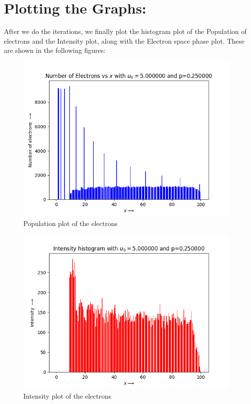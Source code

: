 \documentclass[11pt, a4paper]{article}
\begin{document}
\section{Plotting the Graphs:}
After we do the iterations, we finally plot the histogram plot of the Population of electrons and the Intensity plot, along with the Electron space phase plot. These are shown in the following figures:
\clearpage

\begin{figure}[!tbh]
\centering
\includegraphics[scale=0.56]{hist1_elec_density.png} 
\caption{Population plot of the electrons}
\label{fig:fig_1}
\end{figure} 

\begin{figure}[!tbh]
\centering
\includegraphics[scale=0.56]{hist1_intensity.png} 
\caption{Intensity plot of the electrons}
\label{fig:fig_2}
\end{figure} 
\end{document}
